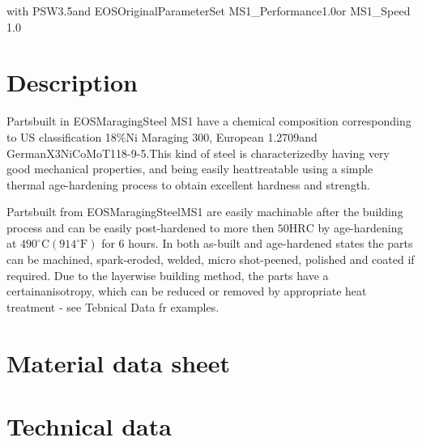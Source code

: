 \documentclass[10pt]{article}
\begin{document}
with PSW3.5and EOSOriginalParameterSet MS1\_Performance1.0or MS1\_Speed 1.0

\section*{Description}
Partsbuilt in EOSMaragingSteel MS1 have a chemical composition corresponding to US classification 18\%Ni Maraging 300, European 1.2709and GermanX3NiCoMoT118-9-5.This kind of steel is characterizedby having very good mechanical properties, and being easily heattreatable using a simple thermal age-hardening process to obtain excellent hardness and strength.

Partsbuilt from EOSMaragingSteelMS1 are easily machinable after the building process and can be easily post-hardened to more then $50 \mathrm{HRC}$ by age-hardening at $490^{\circ} \mathrm{C}\left(914^{\circ} \mathrm{F}\right)$ for 6 hours. In both as-built and age-hardened states the parts can be machined, spark-eroded, welded, micro shot-peened, polished and coated if required. Due to the layerwise building method, the parts have a certainanisotropy, which can be reduced or removed by appropriate heat treatment - see Tebnical Data fr examples.

\section*{Material data sheet}
\section*{Technical data}
\end{document}
